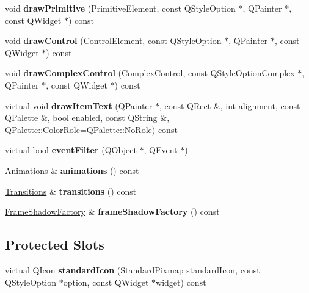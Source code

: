 \begin{DoxyCompactItemize}
void {\bfseries draw\+Primitive} (Primitive\+Element, const Q\+Style\+Option $\ast$, Q\+Painter $\ast$, const Q\+Widget $\ast$) const
\item 
\mbox{\label{class_mg_style_a0c9a809537d18cdccc8aa01a81a5d613}} 
void {\bfseries draw\+Control} (Control\+Element, const Q\+Style\+Option $\ast$, Q\+Painter $\ast$, const Q\+Widget $\ast$) const
\item 
\mbox{\label{class_mg_style_aa1e698f30086fb725f28bf8fca38103f}} 
void {\bfseries draw\+Complex\+Control} (Complex\+Control, const Q\+Style\+Option\+Complex $\ast$, Q\+Painter $\ast$, const Q\+Widget $\ast$) const
\item 
\mbox{\label{class_mg_style_ac85264199de4e9802d7df3851d69664e}} 
virtual void {\bfseries draw\+Item\+Text} (Q\+Painter $\ast$, const Q\+Rect \&, int alignment, const Q\+Palette \&, bool enabled, const Q\+String \&, Q\+Palette\+::\+Color\+Role=Q\+Palette\+::\+No\+Role) const
\item 
\mbox{\label{class_mg_style_a3722bb971c8a4ac39e2de0358dd70b96}} 
virtual bool {\bfseries event\+Filter} (Q\+Object $\ast$, Q\+Event $\ast$)
\item 
\mbox{\label{class_mg_style_abf4e9af2a93b3cbc856721dc9a0cd7d0}} 
\hyperlink{class_animations}{Animations} \& {\bfseries animations} () const
\item 
\mbox{\label{class_mg_style_af5649f7e1216782f70c11db3349cd7ef}} 
\hyperlink{class_transitions}{Transitions} \& {\bfseries transitions} () const
\item 
\mbox{\label{class_mg_style_a8353076a2e844388fa59e40dc931e10e}} 
\hyperlink{class_frame_shadow_factory}{Frame\+Shadow\+Factory} \& {\bfseries frame\+Shadow\+Factory} () const
\end{DoxyCompactItemize}
\subsection*{Protected Slots}
\begin{DoxyCompactItemize}
\item 
\mbox{\label{class_mg_style_aead17acae942f24878909c2c306720cd}} 
virtual Q\+Icon {\bfseries standard\+Icon} (Standard\+Pixmap standard\+Icon, const Q\+Style\+Option $\ast$option, const Q\+Widget $\ast$widget) const
\end{DoxyCompactItemize}


